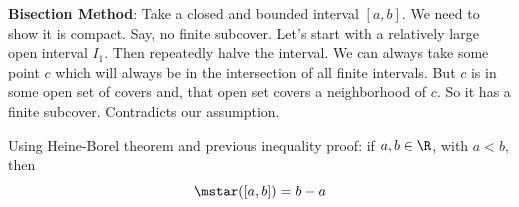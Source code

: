     \begin{proofsketch}
        \textbf{Bisection Method}: Take a closed and bounded interval $[a, b]$. We need to show it is compact. Say, no finite subcover. Let's start with a relatively large open interval $I_1$. Then repeatedly halve the interval. We can always take some point $c$ which will always be in the intersection of all finite intervals. But $c$ is in some open set of covers and, that open set covers a neighborhood of $c$. So it has a finite subcover. Contradicts our assumption. 
    \end{proofsketch}
    \begin{theorem}
        Using Heine-Borel theorem and previous inequality proof: if $a, b\in \R$, with $a<b$, then 
        \[
        \mstar([a, b]) = b-a
        \]
    \end{theorem}
